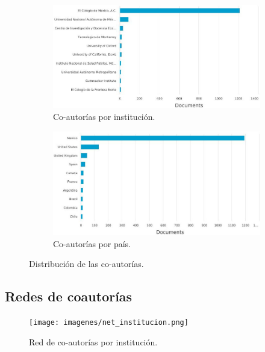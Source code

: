 

\begin{figure}[ht]
	\centering
	\begin{subfigure}[b]{0.48\textwidth}
		\centering
		\includegraphics[width=\textwidth]{imagenes/Scopus-Analyze-Affiliation.jpg}
		\caption{Co-autorías por institución.}
		\label{fig:col_afiliacion}   
	\end{subfigure}
	\hfill
	\begin{subfigure}[b]{0.48\textwidth}
		\centering
		\includegraphics[width=\textwidth]{imagenes/Scopus-Analyze-Country.jpg}
		\caption{Co-autorías por país.}
		\label{fig:col_pais} 
	\end{subfigure}

	\caption{Distribución de las co-autorías.}
	\label{fig:docs_colaboraciones} 
\end{figure}

\newpage
\subsection{Redes de coautorías}
\begin{figure}[ht]

		\centering
		\texttt{[image: imagenes/net\_institucion.png]}
		\caption{Red de co-autorías por institución.}
		\label{fig:net_afiliacion}   

\end{figure}

